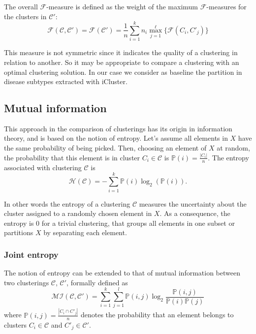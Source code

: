 The overall $\mathcal{F}$-measure is defined as the weight of the maximum $\mathcal{F}$-measures for the clusters in $\mathcal{C}'$:
\begin{equation*}
    \mathcal{F}(\mathcal{C},\mathcal{C}')=\mathcal{F}(\mathcal{C}') = \frac{1}{n}\sum_{i=1}^k n_i\max_{j=1}^\ell\{\mathcal{F}(C_i,C'_j)\}
\end{equation*}

This measure is not symmetric since it indicates the quality of a clustering in relation to another. So it may be appropriate to compare a clustering with an optimal clustering solution. In our case we consider as baseline the partition in disease subtypes extracted with iCluster.

\subsection{Mutual information}
This approach in the comparison of clusterings has its origin in information theory, and is based on the notion of entropy. Let's assume all elements in $X$ have the same probability of being picked. Then, choosing an element of $X$ at random, the probability that this element is in cluster $C_i\in\mathcal{C}$ is $\mathbb{P}(i)=\frac{|C_i|}{n}$. The entropy associated with clustering $\mathcal{C}$ is
\begin{equation*}
    \mathcal{H}(\mathcal{C})=-\sum_{i=1}^k\mathbb{P}(i)\log_{2}{(\mathbb{P}(i))}.
\end{equation*}

In other words the entropy of a clustering $\mathcal{C}$ measures the uncertainty about the cluster assigned to a randomly chosen element in $X$. As a consequence, the entropy is 0 for a trivial clustering, that groups all elements in one subset or partitions $X$ by separating each element.

\subsubsection{Joint entropy}
The notion of entropy can be extended to that of mutual information between two clusterings $\mathcal{C}$, $\mathcal{C}'$, formally defined as
\begin{equation*}
       \mathcal{MI}(\mathcal{C}, \mathcal{C}') = \sum_{i=1}^{k} \sum_{j=1}^{l} \mathbb{P}(i,j) \log_{2}{ \frac{\mathbb{P}(i,j)}{\mathbb{P}(i)\mathbb{P}(j)} }
\end{equation*}
where $\mathbb{P}(i,j)=\frac{|C_i\cap C'_j|}{n}$ denotes the probability that an element belongs to clusters $C_i\in\mathcal{C}$ and $C'_j\in\mathcal{C}'$.

